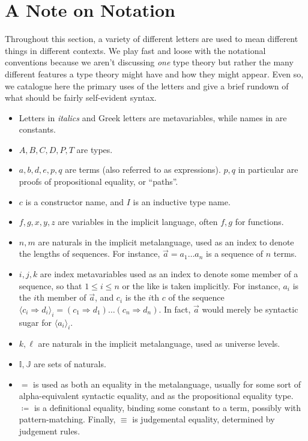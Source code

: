 \documentclass{report}
\newcommand{\const}[1]{\text{#1}}
\begin{document}
\newpage
\section{A Note on Notation}

Throughout this section, a variety of different letters are used to mean different things in different contexts. We play fast and loose with the notational conventions because we aren't discussing \emph{one} type theory but rather the many different features a type theory might have and how they might appear. Even so, we catalogue here the primary uses of the letters and give a brief rundown of what should be fairly self-evident syntax.

\begin{itemize}
    \item Letters in \textit{italics} and Greek letters are metavariables, while names in \const{roman} are constants. %
    \item $A, B, C, D, P, T$ are types.
    \item $a, b, d, e, p, q$ are terms (also referred to as expressions). $p, q$ in particular are proofs of propositional equality, or ``paths''.
    \item $c$ is a constructor name, and $I$ is an inductive type name.
    \item $f, g, x, y, z$ are variables in the implicit language, often $f, g$ for functions.
    \item $n, m$ are naturals in the implicit metalanguage, used as an index to denote the lengths of sequences. For instance, $\Vec{a} = a_1 \dots a_n$ is a sequence of $n$ terms.
    \item $i, j, k$ are index metavariables used as an index to denote some member of a sequence, so that $1 \leq i \leq n$ or the like is taken implicitly. For instance, $a_i$ is the $i$th member of $\Vec{a}$, and $c_i$ is the $i$th $c$ of the sequence $\langle c_i \Rightarrow d_i \rangle_i = (c_1 \Rightarrow d_1) \dots (c_n \Rightarrow d_n)$. In fact, $\Vec{a}$ would merely be syntactic sugar for $\langle a_i \rangle_i$.
    \item $k, \ell$ are naturals in the implicit metalanguage, used as universe levels.
    \item $\mathbb{I}, \mathbb{J}$ are sets of naturals.
    \item $=$ is used as both an equality in the metalanguage, usually for some sort of alpha-equivalent syntactic equality, and as the propositional equality type. $\coloneqq$ is a definitional equality, binding some constant to a term, possibly with pattern-matching. Finally, $\equiv$ is judgemental equality, determined by judgement rules.
\end{itemize}
\end{document}

